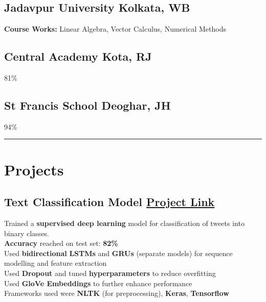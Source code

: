\documentclass[]{Ankit-resume}
\begin{document}
\subsection{Jadavpur University \hfill \normalfont K\lowercase{olkata}, WB}
\vspace{1}
\textbf{Course Works:} Linear Algebra, Vector Calculus, Numerical Methods
\sectionsep

\subsection{Central Academy \hfill \normalfont K\lowercase{ota}, RJ}
\vspace{1}
\textbullet{} 81\%
\sectionsep

\subsection{St Francis School \hfill \normalfont D\lowercase{eoghar}, JH}
\vspace{1}
\textbullet{} 94\% \\
\vspace{\baselineskip}
{\color{black}\hrule}
\sectionsep




\section{Projects} 
\postsectionsep
\vspace{\baselineskip}
\subsection{T\lowercase{ext} C\lowercase{lassification} M\lowercase{odel} \hfill \normalfont \href{https://github.com/ankitsharma1999/Text-Classifier}{P\lowercase{roject} L\lowercase{ink}}}
\vspace{2}
\textbullet{} Trained a \textbf{supervised deep learning} model for classification of tweets into binary classes. \\
\vspace{1}
\textbullet{} \textbf{Accuracy} reached on test set: \textbf{82\%} \\
\vspace{1}
\textbullet{} Used \textbf{bidirectional} \textbf{LSTMs} and \textbf{GRUs} (separate models) for sequence modelling and feature extraction \\
\vspace{1}
\textbullet{} Used \textbf{Dropout} and tuned \textbf{hyperparameters} to reduce overfitting\\
\vspace{1}
\textbullet{} Used \textbf{GloVe Embeddings} to further enhance performance \\
\vspace{1}
\textbullet{} Frameworks used were \textbf{NLTK} (for preprocessing), \textbf{Keras}, \textbf{Tensorflow}
\sectionsep
\end{document}
